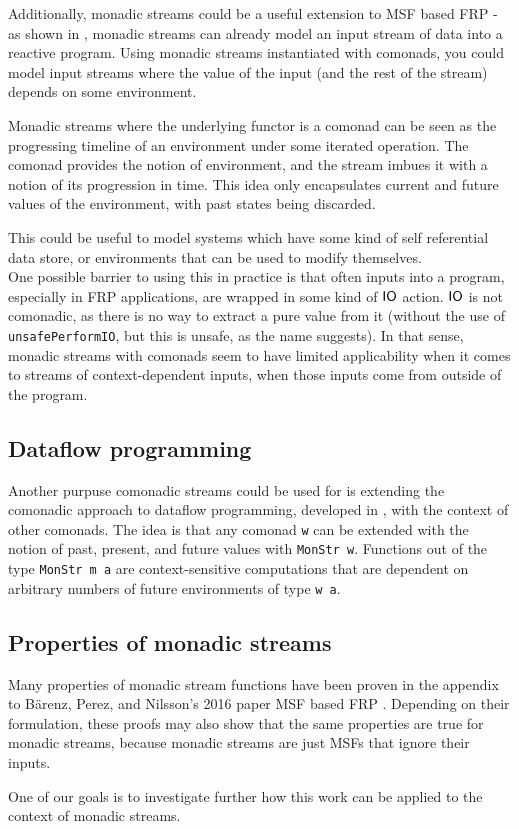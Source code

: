 Additionally, monadic streams could be a useful extension to MSF based FRP - as shown in \cite{frp_refactored}, monadic streams can already model an input stream of data into a reactive program. Using monadic streams instantiated with comonads, you could model input streams where the value of the input (and the rest of the stream) depends on some environment. 

Monadic streams where the underlying functor is a comonad can be seen as the progressing timeline of an environment under some iterated operation. The comonad provides the notion of environment, and the stream imbues it with a notion of its progression in time. This idea only encapsulates current and future values of the environment, with past states being discarded.

This could be useful to model systems which have some kind of self referential data store, or environments that can be used to modify themselves. \\

One possible barrier to using this in practice is that often inputs into a program, especially in FRP applications, are wrapped in some kind of $\mathsf{IO}$ action. $\mathsf{IO}$ is not comonadic, as there is no way to extract a pure value from it (without the use of \verb+unsafePerformIO+, but this is unsafe, as the name suggests). In that sense, monadic streams with comonads seem to have limited applicability when it comes to streams of context-dependent inputs, when those inputs come from outside of the program.


\subsection{Dataflow programming}

Another purpuse comonadic streams could be used for is extending the comonadic approach to dataflow programming, developed in \cite{essence_of_dataflow}, with the context of other comonads. The idea is that any comonad \verb+w+ can be extended with the notion of past, present, and future values with \verb+MonStr w+. Functions out of the type \verb+MonStr m a+ are context-sensitive computations that are dependent on arbitrary numbers of future environments of type \verb+w a+.

\subsection{Properties of monadic streams}

Many properties of monadic stream functions have been proven in the appendix \cite{msf_properties} to Bärenz, Perez, and Nilsson's 2016 paper MSF based FRP \cite{frp_refactored}. Depending on their formulation, these proofs may also show that the same properties are true for monadic streams, because monadic streams are just MSFs that ignore their inputs. 

One of our goals is to investigate further how this work can be applied to the context of monadic streams.
